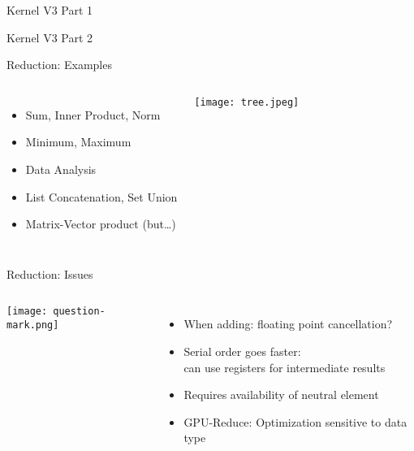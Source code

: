 \documentclass[english,compress]{beamer}
\begin{document}
\begin{frame}{Kernel V3 Part 1}
  
\end{frame}
\begin{frame}{Kernel V3 Part 2}
  
\end{frame}
\begin{frame}{Reduction: Examples}
  \begin{columns}
      \begin{itemize}
        \item Sum, Inner Product, Norm
        \item Minimum, Maximum
        \item Data Analysis
        \item List Concatenation, Set Union
        \item Matrix-Vector product (but\dots)
      \end{itemize}
      \texttt{[image: tree.jpeg]}
  \end{columns}
\end{frame}
\begin{frame}{Reduction: Issues}
  \begin{columns}
      \texttt{[image: question-mark.png]}
      \begin{itemize}
        \item When adding: floating point cancellation?
        \item Serial order goes faster:\\ can use registers for intermediate results
        \item Requires availability of neutral element
        \item GPU-Reduce: Optimization sensitive to data type
      \end{itemize}
  \end{columns}
\end{frame}
\end{document}
